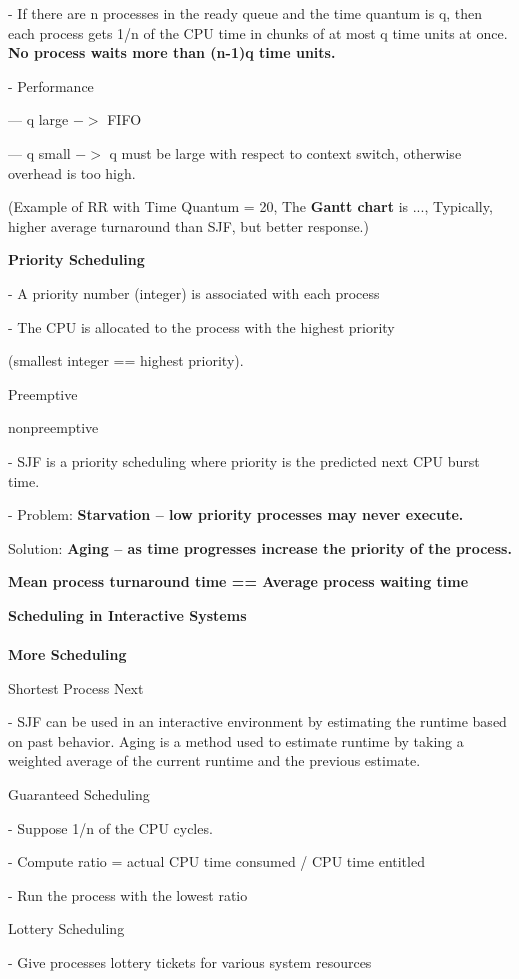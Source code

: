 \documentclass[]{report}
\begin{document}
- If there are n processes in the ready queue and the
time quantum is q, then each process gets 1/n of the
CPU time in chunks of at most q time units at once.
\textbf{No process waits more than (n-1)q time units.}

- Performance

--- q large $->$ FIFO

--- q small $->$ q must be large with respect to context
switch, otherwise overhead is too high.

(Example of RR with Time Quantum = 20, The \textbf{Gantt chart} is ..., Typically, higher average turnaround than SJF, but better
response.)

\textbf{Priority Scheduling}

- A priority number (integer) is associated with each process

- The CPU is allocated to the process with the highest priority

(smallest integer == highest priority).

Preemptive

nonpreemptive

- SJF is a priority scheduling where priority is the predicted
next CPU burst time.

- Problem: \textbf{Starvation – low priority processes may never
execute.}

Solution: \textbf{Aging – as time progresses increase the priority of
the process.}

\textbf{Mean process turnaround time == Average process waiting time}

\textbf{Scheduling in Interactive Systems}\\\\
\textbf{More Scheduling}

Shortest Process Next

- SJF can be used in an interactive environment by estimating
the runtime based on past behavior. Aging is a method used
to estimate runtime by taking a weighted average of the
current runtime and the previous estimate.

Guaranteed Scheduling

- Suppose 1/n of the CPU cycles.

- Compute ratio = actual CPU time consumed / CPU time
entitled

- Run the process with the lowest ratio

Lottery Scheduling

- Give processes lottery tickets for various system resources
\end{document}
